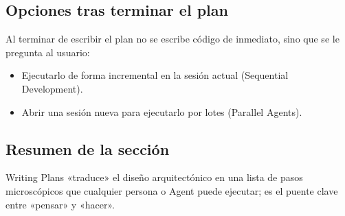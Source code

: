 \subsection{Opciones tras terminar el plan}

Al terminar de escribir el plan no se escribe código de inmediato, sino que se le pregunta al usuario:
\begin{itemize}
    \item Ejecutarlo de forma incremental en la sesión actual (Sequential Development).
    \item Abrir una sesión nueva para ejecutarlo por lotes (Parallel Agents).
\end{itemize}

\subsection{Resumen de la sección}

Writing Plans «traduce» el diseño arquitectónico en una lista de pasos microscópicos que cualquier persona o Agent puede ejecutar; es el puente clave entre «pensar» y «hacer».

